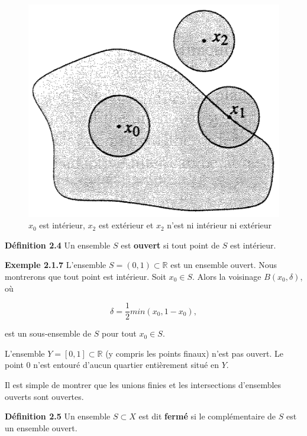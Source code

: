 \documentclass[10pt,twoside,a4paper]{book}
\begin{document}
\begin{figure}[h]
  \centering
  \includegraphics[scale=0.5]{fig2.4}
  \caption{$x_0$ est intérieur, $x_2$ est extérieur et $x_2$ n'est ni intérieur ni extérieur}
\end{figure}

\vspace{2mm}
\noindent
\textbf{Définition 2.4} Un ensemble $S$ est \textbf{ouvert} si tout point de $S$ est intérieur.

\vspace{4mm}
\noindent
\textbf{Exemple 2.1.7} L'ensemble $S = (0, 1) \subset \mathbb{R}$ est un ensemble ouvert. Nous montrerons que tout point est intérieur. Soit $x_0 \in S$. Alors la voisinage $B(x_0, \delta)$, où

\begin{equation*}
  \delta = \frac{1}{2} min(x_0, 1 - x_0),
\end{equation*}

\noindent
est un sous-ensemble de $S$ pour tout $x_0 \in S$.

L'ensemble $Y = [0, 1] \subset \mathbb{R}$ (y compris les points finaux) n'est pas ouvert. Le point 0 n'est entouré d'aucun quartier entièrement situé en $Y$.

Il est simple de montrer que les unions finies et les intersections d'ensembles ouverts sont ouvertes.

\vspace{4mm}
\noindent
\textbf{Définition 2.5} Un ensemble $S \subset X$ est dit \textbf{fermé} si le complémentaire de $S$ est un ensemble ouvert.
\end{document}
